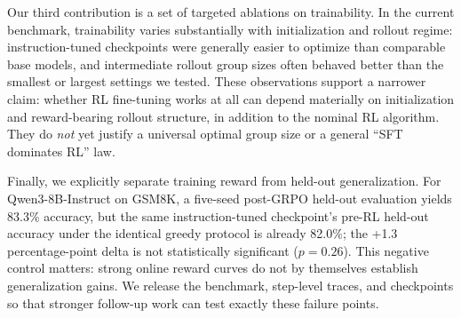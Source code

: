 Our third contribution is a set of targeted ablations on trainability. In the
current benchmark, trainability varies substantially with initialization and
rollout regime: instruction-tuned checkpoints were generally easier to
optimize than comparable base models, and intermediate rollout group sizes
often behaved better than the smallest or largest settings we tested. These
observations support a narrower claim: whether RL fine-tuning works at all can
depend materially on initialization and reward-bearing rollout structure, in
addition to the nominal RL algorithm. They do \emph{not} yet justify a
universal optimal group size or a general ``SFT dominates RL'' law.

Finally, we explicitly separate training reward from held-out generalization.
For Qwen3-8B-Instruct on GSM8K, a five-seed post-GRPO held-out evaluation yields
83.3\% accuracy, but the same instruction-tuned checkpoint's pre-RL held-out
accuracy under the identical greedy protocol is already 82.0\%; the
+1.3 percentage-point delta is not statistically significant ($p{=}0.26$).
This negative control matters: strong online reward curves do not by themselves
establish generalization gains. We release the benchmark, step-level traces,
and checkpoints so that stronger follow-up work can test exactly these failure
points.
